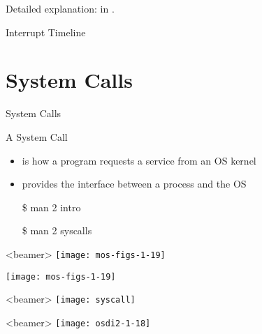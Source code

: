 Detailed explanation: in .

\begin{frame}{Interrupt Timeline}
  \begin{center}
  \end{center}
\end{frame}

\section{System Calls}
\label{sec:system-calls}


\begin{frame}{System Calls}
  \begin{block}{A System Call}
    \begin{itemize}
    \item is how a program requests a service from an OS kernel
    \item provides the interface between a process and the OS
    \end{itemize}
  \end{block}
  \ttfamily
  \begin{itemize}
  \item[\$] man 2 intro
  \item[\$] man 2 syscalls
  \end{itemize}
\end{frame}

\begin{frame}<beamer>
  \centering\texttt{[image: mos-figs-1-19]}
\end{frame}

\begin{center}
  \texttt{[image: mos-figs-1-19]}
\end{center}

\begin{frame}<beamer>
  \centering\texttt{[image: syscall]}
\end{frame}

\begin{frame}<beamer>
  \centering\texttt{[image: osdi2-1-18]}
\end{frame}

